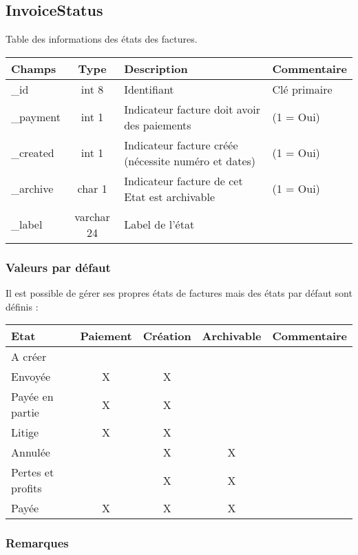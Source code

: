 \subsection{InvoiceStatus}
Table des informations des états des factures.\\

\begin{tabular}{|p{3cm}|c|p{5.4cm}|p{2.6cm}|}
\hline
\textbf{Champs} & \textbf{Type} & \textbf{Description} & \textbf{Commentaire} \\
\hline
\_id & int 8 & Identifiant & Clé primaire \\
\hline
\_payment & int 1 & Indicateur facture doit avoir des paiements & (1 = Oui) \\
\hline
\_created & int 1 & Indicateur facture créée (nécessite numéro et dates) & (1 = Oui) \\
\hline
\_archive & char 1 & Indicateur facture de cet Etat est archivable & (1 = Oui)\\
\hline
\_label & varchar 24 & Label de l'état & \\
\hline
\end{tabular}


\subsubsection{Valeurs par défaut}

Il est possible de gérer ses propres états de factures mais des états par défaut sont définis :\\

\begin{tabular}{|p{3cm}|c|c|c|p{4cm}|}
\hline
\textbf{Etat} & \textbf{Paiement} & \textbf{Création} & \textbf{Archivable} & \textbf{Commentaire} \\
\hline
A créer & & & & \\
\hline
Envoyée & X & X & & \\
\hline
Payée en partie & X & X & & \\
\hline
Litige & X & X & & \\
\hline
Annulée & & X & X & \\
\hline
Pertes et profits & & X & X & \\
\hline
Payée & X & X & X & \\
\hline
\end{tabular}

\subsubsection{Remarques}


